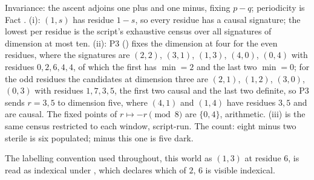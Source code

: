 Invariance: the ascent adjoins one plus and one minus, fixing $p - q$; periodicity is Fact . (i): $(1,s)$ has residue $1 - s$, so every residue has a causal signature; the lowest per residue is the script's exhaustive census over all signatures of dimension at most ten. (ii): P3 () fixes the dimension at four for the even residues, where the signatures are $(2,2)$, $(3,1)$, $(1,3)$, $(4,0)$, $(0,4)$ with residues $0, 2, 6, 4, 4$, of which the first has $\min = 2$ and the last two $\min = 0$; for the odd residues the candidates at dimension three are $(2,1)$, $(1,2)$, $(3,0)$, $(0,3)$ with residues $1, 7, 3, 5$, the first two causal and the last two definite, so P3 sends $r = 3, 5$ to dimension five, where $(4,1)$ and $(1,4)$ have residues $3, 5$ and are causal. The fixed points of $r \mapsto -r \pmod 8$ are $\{0, 4\}$, arithmetic. (iii) is the same census restricted to each window, script-run. The count: eight minus two sterile is six populated; minus this one is five dark.

The labelling convention used throughout, this world as $(1,3)$ at residue $6$, is read as indexical under , which declares which of $2$, $6$ is visible indexical.
